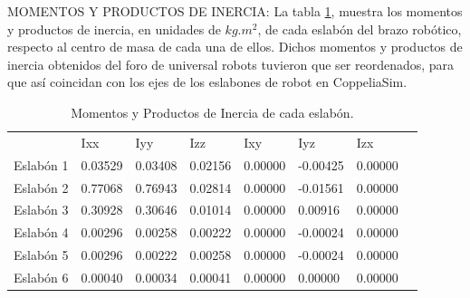 \documentclass{article}
\begin{document}
MOMENTOS Y PRODUCTOS DE INERCIA:
La tabla \ref{table:Momentos y Productos de Inercia de cada eslabón}, muestra los momentos y productos de inercia, en unidades de $kg.m^2$, de cada eslabón del brazo robótico, respecto al centro de masa de cada una de ellos.
Dichos momentos y productos de inercia obtenidos del foro de universal robots tuvieron que ser reordenados, para que así coincidan con los ejes de los eslabones de robot en CoppeliaSim. %
\begin{table}[]
\begin{center}
\begin{tabular}{l|lll|lll|l}
\cline{2-7}
& Ixx     & Iyy     & Izz     & Ixy     & Iyz      & Izx     &         \\ \cline{2-7}
Eslabón 1 & 0.03529 & 0.03408 & 0.02156 & 0.00000 & -0.00425 & 0.00000 \\
Eslabón 2 & 0.77068 & 0.76943 & 0.02814 & 0.00000 & -0.01561 & 0.00000 \\
Eslabón 3 & 0.30928 & 0.30646 & 0.01014 & 0.00000 & 0.00916  & 0.00000 \\
Eslabón 4 & 0.00296 & 0.00258 & 0.00222 & 0.00000 & -0.00024 & 0.00000 \\
Eslabón 5 & 0.00296 & 0.00222 & 0.00258 & 0.00000 & -0.00024 & 0.00000 \\
Eslabón 6 & 0.00040 & 0.00034 & 0.00041 & 0.00000 & 0.00000  & 0.00000 \\ \cline{2-7}
\end{tabular}
\caption{\label{table:Momentos y Productos de Inercia de cada eslabón}Momentos y Productos de Inercia de cada eslabón.}
\end{center}
\end{table}
\end{document}
